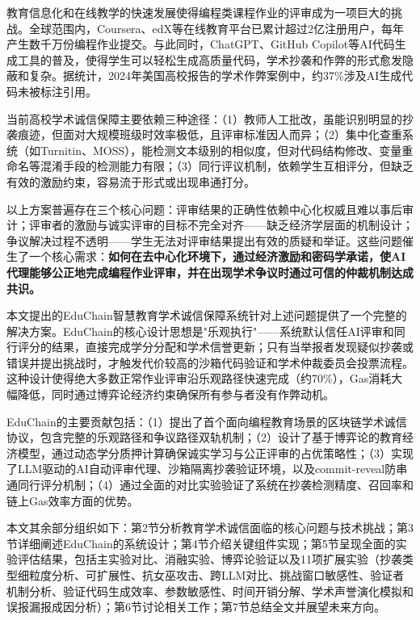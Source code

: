 \documentclass[10.5pt,compsoc]{CjC}
\begin{document}
教育信息化和在线教学的快速发展使得编程类课程作业的评审成为一项巨大的挑战。全球范围内，Coursera、edX等在线教育平台已累计超过2亿注册用户，每年产生数千万份编程作业提交。与此同时，ChatGPT、GitHub Copilot等AI代码生成工具的普及，使得学生可以轻松生成高质量代码，学术抄袭和作弊的形式愈发隐蔽和复杂。据统计，2024年美国高校报告的学术作弊案例中，约37\%涉及AI生成代码未被标注引用\cite{zhang2024edu}。

当前高校学术诚信保障主要依赖三种途径：（1）教师人工批改，虽能识别明显的抄袭痕迹，但面对大规模班级时效率极低，且评审标准因人而异；（2）集中化查重系统（如Turnitin\cite{turnitin2024}、MOSS\cite{aiken1994}），能检测文本级别的相似度，但对代码结构修改、变量重命名等混淆手段的检测能力有限；（3）同行评议机制，依赖学生互相评分，但缺乏有效的激励约束，容易流于形式或出现串通打分。

以上方案普遍存在三个核心问题：评审结果的正确性依赖中心化权威且难以事后审计；评审者的激励与诚实评审的目标不完全对齐——缺乏经济学层面的机制设计；争议解决过程不透明——学生无法对评审结果提出有效的质疑和举证。这些问题催生了一个核心需求：\textbf{如何在去中心化环境下，通过经济激励和密码学承诺，使AI代理能够公正地完成编程作业评审，并在出现学术争议时通过可信的仲裁机制达成共识。}

本文提出的EduChain智慧教育学术诚信保障系统针对上述问题提供了一个完整的解决方案。EduChain的核心设计思想是"乐观执行"——系统默认信任AI评审和同行评分的结果，直接完成学分分配和学术信誉更新；只有当举报者发现疑似抄袭或错误并提出挑战时，才触发代价较高的沙箱代码验证和学术仲裁委员会投票流程。这种设计使得绝大多数正常作业评审沿乐观路径快速完成（约70\%），Gas消耗大幅降低，同时通过博弈论经济约束确保所有参与者没有作弊动机。

EduChain的主要贡献包括：（1）提出了首个面向编程教育场景的区块链学术诚信协议，包含完整的乐观路径和争议路径双轨机制；（2）设计了基于博弈论的教育经济模型，通过动态学分质押计算确保诚实学习与公正评审的占优策略性；（3）实现了LLM驱动的AI自动评审代理、沙箱隔离抄袭验证环境，以及commit-reveal防串通同行评分机制；（4）通过全面的对比实验验证了系统在抄袭检测精度、召回率和链上Gas效率方面的优势。

本文其余部分组织如下：第2节分析教育学术诚信面临的核心问题与技术挑战；第3节详细阐述EduChain的系统设计；第4节介绍关键组件实现；第5节呈现全面的实验评估结果，包括主实验对比、消融实验、博弈论验证以及11项扩展实验（抄袭类型细粒度分析、可扩展性、抗女巫攻击、跨LLM对比、挑战窗口敏感性、验证者机制分析、验证代码生成效率、参数敏感性、时间开销分解、学术声誉演化模拟和误报漏报成因分析）；第6节讨论相关工作；第7节总结全文并展望未来方向。

\end{document}
